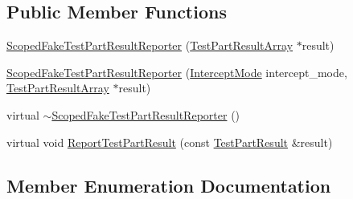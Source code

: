 \subsection*{Public Member Functions}
\begin{DoxyCompactItemize}
\item 
\hyperlink{classtesting_1_1_scoped_fake_test_part_result_reporter_aa0100ecf4799fb51d45167be6a5de1d5}{Scoped\+Fake\+Test\+Part\+Result\+Reporter} (\hyperlink{classtesting_1_1_test_part_result_array}{Test\+Part\+Result\+Array} $\ast$result)
\item 
\hyperlink{classtesting_1_1_scoped_fake_test_part_result_reporter_a57cbc09ed48627c8a73e622618dc4b4f}{Scoped\+Fake\+Test\+Part\+Result\+Reporter} (\hyperlink{classtesting_1_1_scoped_fake_test_part_result_reporter_a82f6209b3cf5c4b15ec8bd8041dbc2d5}{Intercept\+Mode} intercept\+\_\+mode, \hyperlink{classtesting_1_1_test_part_result_array}{Test\+Part\+Result\+Array} $\ast$result)
\item 
virtual \hyperlink{classtesting_1_1_scoped_fake_test_part_result_reporter_a4817d59ca70228ebd5d5c3c4e8dd729d}{$\sim$\+Scoped\+Fake\+Test\+Part\+Result\+Reporter} ()
\item 
virtual void \hyperlink{classtesting_1_1_scoped_fake_test_part_result_reporter_a82531434f51632d98ed7cdcdb10b8b92}{Report\+Test\+Part\+Result} (const \hyperlink{classtesting_1_1_test_part_result}{Test\+Part\+Result} \&result)
\end{DoxyCompactItemize}


\subsection{Member Enumeration Documentation}
\hypertarget{classtesting_1_1_scoped_fake_test_part_result_reporter_a82f6209b3cf5c4b15ec8bd8041dbc2d5}{}
